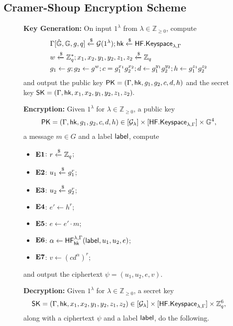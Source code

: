 \subsection{Cramer-Shoup Encryption Scheme}

	\begin{figure}[tbp]
	\begin{framed}\small
		\textbf{Key Generation:} On input $1^\lambda$ from $\lambda\in\mathbb{Z}_{\geq 0}$, compute
		\begin{align*}
			&\Gamma[\hat{\mathbb{G}}, \mathbb{G}, g, q]\xleftarrow{\$}\mathcal{G}(1^\lambda); \mathsf{hk}\xleftarrow{\$}\mathsf{HF.Keyspace}_{\lambda,\Gamma}\\
			&w\xleftarrow{\$}\mathbb{Z}_q^{*}; x_1,x_2,y_1,y_2,z_1,z_2\xleftarrow{\$}\mathbb{Z}_q\\
			&g_1\gets g; g_2\gets g^{w}; c = g_1^{x_1}g_2^{x_2}; d\gets g_1^{y_1}g_2^{y_2}; h\gets g_1^{z_1}g_2^{z_2}
		\end{align*}
		and output the public key $\mathsf{PK} = (\Gamma,\mathsf{hk},g_1,g_2,c,d,h)$ and the secret key $\mathsf{SK} = (\Gamma, \mathsf{hk}, x_1,x_2,y_1,y_2,z_1,z_2).$
		
		\vspace{4mm}
		
		\textbf{Encryption:} Given $1^\lambda$ for $\lambda\in\mathbb{Z}_{\geq 0}$, a public key $$\mathsf{PK}=(\Gamma,\mathsf{hk},g_1,g_2,c,d,h)\in[\mathcal{G}_\lambda]\times[\mathsf{HF.Keyspace}_{\lambda,\Gamma}]\times\mathbb{G}^4,$$ a message $m\in G$ and a label $\mathsf{label}$, compute
		
		\begin{itemize}
			\itemsep=0em
			\item[]\textbf{$\mathbf{E1}$}: $r\xleftarrow{\$}\mathbb{Z}_q$;
			\item[]\textbf{$\mathbf{E2}$}: $u_1\xleftarrow{\$} g_1^r$;
			\item[]\textbf{$\mathbf{E3}$}: $u_2\xleftarrow{\$} g_2^r$;
			\item[]\textbf{$\mathbf{E4}$}: $e'\gets h^r$;
			\item[]\textbf{$\mathbf{E5}$}: $e\gets e'\cdot m$;
			\item[]\textbf{$\mathbf{E6}$}: $\alpha\gets\mathsf{HF}^{\lambda,\Gamma}_{\mathsf{hk}}(\mathsf{label}, u_1, u_2, e)$;
			\item[]\textbf{$\mathbf{E7}$}: $v\gets (cd^\alpha)^r$;
		\end{itemize}
		and output the ciphertext $\psi = (u_1, u_2, e, v)$.
		
		\vspace{4mm}
		
		\textbf{Decryption:} Given $1^\lambda$ for $\lambda\in\mathbb{Z}_{\geq 0}$, a secret key $$\mathsf{SK}=(\Gamma, \mathsf{hk}, x_1,x_2,y_1,y_2,z_1,z_2)\in[\mathcal{G}_\lambda]\times[\mathsf{HF.Keyspace}_{\lambda,\Gamma}]\times\mathbb{Z}_q^{6},$$
		along with a ciphertext $\psi$ and a label $\mathsf{label}$, do the following.
		

\end{framed}
\end{figure}
